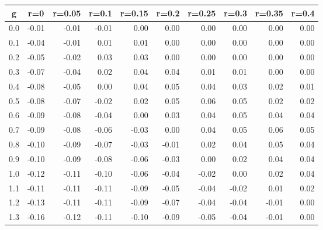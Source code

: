 %
\begin{table}[!tbp]
 \begin{center}
 \begin{tabular}{rrrrrrrrrr}\hline\hline
\multicolumn{1}{c}{g}&\multicolumn{1}{c}{r=0}&\multicolumn{1}{c}{r=0.05}&\multicolumn{1}{c}{r=0.1}&\multicolumn{1}{c}{r=0.15}&\multicolumn{1}{c}{r=0.2}&\multicolumn{1}{c}{r=0.25}&\multicolumn{1}{c}{r=0.3}&\multicolumn{1}{c}{r=0.35}&\multicolumn{1}{c}{r=0.4}\tabularnewline
\hline
0.0&-0.01&-0.01&-0.01& 0.00& 0.00& 0.00& 0.00& 0.00&0.00\tabularnewline
0.1&-0.04&-0.01& 0.01& 0.01& 0.00& 0.00& 0.00& 0.00&0.00\tabularnewline
0.2&-0.05&-0.02& 0.03& 0.03& 0.00& 0.00& 0.00& 0.00&0.00\tabularnewline
0.3&-0.07&-0.04& 0.02& 0.04& 0.04& 0.01& 0.01& 0.00&0.00\tabularnewline
0.4&-0.08&-0.05& 0.00& 0.04& 0.05& 0.04& 0.03& 0.02&0.01\tabularnewline
0.5&-0.08&-0.07&-0.02& 0.02& 0.05& 0.06& 0.05& 0.02&0.02\tabularnewline
0.6&-0.09&-0.08&-0.04& 0.00& 0.03& 0.04& 0.05& 0.04&0.04\tabularnewline
0.7&-0.09&-0.08&-0.06&-0.03& 0.00& 0.04& 0.05& 0.06&0.05\tabularnewline
0.8&-0.10&-0.09&-0.07&-0.03&-0.01& 0.02& 0.04& 0.05&0.04\tabularnewline
0.9&-0.10&-0.09&-0.08&-0.06&-0.03& 0.00& 0.02& 0.04&0.04\tabularnewline
1.0&-0.12&-0.11&-0.10&-0.06&-0.04&-0.02& 0.00& 0.02&0.04\tabularnewline
1.1&-0.11&-0.11&-0.11&-0.09&-0.05&-0.04&-0.02& 0.01&0.02\tabularnewline
1.2&-0.13&-0.11&-0.11&-0.09&-0.07&-0.04&-0.04&-0.01&0.00\tabularnewline
1.3&-0.16&-0.12&-0.11&-0.10&-0.09&-0.05&-0.04&-0.01&0.00\tabularnewline
\hline
\end{tabular}

\end{center}

\end{table}

